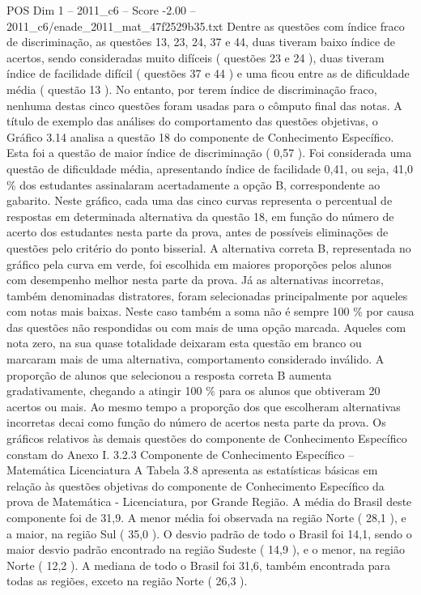 \begin{textsample}{POS Dim 1 – 2011\_c6 – Score -2.00 – 2011\_c6/enade\_2011\_mat\_47f2529b35.txt}
Dentre as questões com índice fraco de discriminação, as questões 13, 23, 24, 37 e 44, duas tiveram baixo índice de acertos, sendo consideradas muito difíceis ( questões 23 e 24 ), duas tiveram índice de facilidade difícil ( questões 37 e 44 ) e uma ficou entre as de dificuldade média ( questão 13 ).
No entanto, por terem índice de discriminação fraco, nenhuma destas cinco questões foram usadas para o cômputo final das notas.
A título de exemplo das análises do comportamento das questões objetivas, o Gráfico 3.14 analisa a questão 18 do componente de Conhecimento Específico.
Esta foi a questão de maior índice de discriminação ( 0,57 ).
Foi considerada uma questão de dificuldade média, apresentando índice de facilidade 0,41, ou seja, 41,0 \% dos estudantes assinalaram acertadamente a opção B, correspondente ao gabarito.
Neste gráfico, cada uma das cinco curvas representa o percentual de respostas em determinada alternativa da questão 18, em função do número de acerto dos estudantes nesta parte da prova, antes de possíveis eliminações de questões pelo critério do ponto bisserial.
A alternativa correta B, representada no gráfico pela curva em verde, foi escolhida em maiores proporções pelos alunos com desempenho melhor nesta parte da prova.
Já as alternativas incorretas, também denominadas distratores, foram selecionadas principalmente por aqueles com notas mais baixas.
Neste caso também a soma não é sempre 100 \% por causa das questões não respondidas ou com mais de uma opção marcada.
Aqueles com nota zero, na sua quase totalidade deixaram esta questão em branco ou marcaram mais de uma alternativa, comportamento considerado inválido.
A proporção de alunos que selecionou a resposta correta B aumenta gradativamente, chegando a atingir 100 \% para os alunos que obtiveram 20 acertos ou mais.
Ao mesmo tempo a proporção dos que escolheram alternativas incorretas decai como função do número de acertos nesta parte da prova.
Os gráficos relativos às demais questões do componente de Conhecimento Específico constam do Anexo I. 3.2.3 Componente de Conhecimento Específico – Matemática Licenciatura A Tabela 3.8 apresenta as estatísticas básicas em relação às questões objetivas do componente de Conhecimento Específico da prova de Matemática - Licenciatura, por Grande Região.
A média do Brasil deste componente foi de 31,9.
A menor média foi observada na região Norte ( 28,1 ), e a maior, na região Sul ( 35,0 ).
O desvio padrão de todo o Brasil foi 14,1, sendo o maior desvio padrão encontrado na região Sudeste ( 14,9 ), e o menor, na região Norte ( 12,2 ).
A mediana de todo o Brasil foi 31,6, também encontrada para todas as regiões, exceto na região Norte ( 26,3 ).

\end{textsample}

